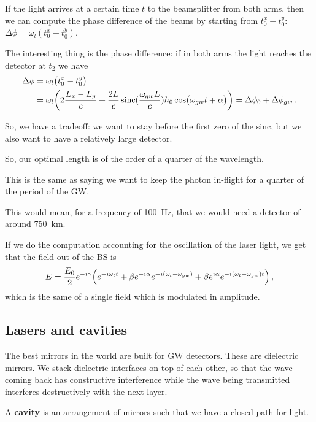 \documentclass[main.tex]{subfiles}
\begin{document}
If the light arrives at a certain time \(t\) to the beamsplitter from both arms, then we can compute the phase difference of the beams by starting from \(t_0^{x} - t_0^{y}\):  \(\Delta \phi = \omega_{l} (t_0^{x} - t_0^{y})\). 

The interesting thing is the phase difference: if in both arms the light reaches the detector at \(t_2 \) we have 
%
\begin{subequations}
\begin{align}
\Delta \phi 
&= \omega_{l} \qty(t_0^{x }- t_0^{y}) \\
&= \omega_{l} \qty(2 \frac{L_x -L_y}{c} + \frac{2L}{c} \operatorname{sinc}(\frac{\omega_{gw} L}{c} ) h_0 \cos(\omega_{gw} t + \alpha )) = \Delta \phi_0 + \Delta \phi_{gw}
\,.
\end{align}
\end{subequations}

So, we have a tradeoff: we want to stay before the first zero of the sinc, but we also want to have a relatively large detector.

So, our optimal length is of the order of a quarter of the wavelength.

This is the same as saying we want to keep the photon in-flight for a quarter of the period of the GW. 

This would mean, for a frequency of \SI{100}{Hz}, that we would need a detector of around \SI{750}{km}.

If we do the computation accounting for the oscillation of the laser light, we get that the field out of the BS is 
%
\begin{align}
E = \frac{E_0}{2} e^{-i \gamma } \qty(e^{-i \omega_{l} t}
+ \beta e^{-i \alpha } e^{-i (\omega_{l} - \omega_{gw})} + \beta e^{i \alpha } e^{-i (\omega_{l} + \omega_{gw}) t})
\,,
\end{align}
%
which is the same of a single field which is modulated in amplitude.

\subsection{Lasers and cavities}

The best mirrors in the world are built for GW detectors.
These are dielectric mirrors.
We stack dielectric interfaces on top of each other, so that the wave coming back has constructive interference while the wave being transmitted interferes destructively with the next layer.

A \textbf{cavity} is an arrangement of mirrors such that we have a closed path for light.
\end{document}
